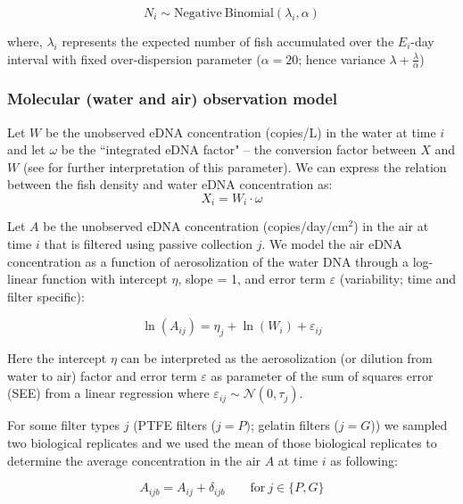 \documentclass{article}
\begin{document}
\begin{equation}
N_i \sim \mathrm{Negative\ Binomial}(\lambda_i, \alpha)
\end{equation} 

where, $\lambda_i$ represents the expected number of fish accumulated over the $E_i$-day interval with fixed over-dispersion parameter ($\alpha =20$; hence variance $\lambda+\frac{\lambda}{\alpha}$) \cite{welch1993,guri2024a}

\subsubsection{Molecular (water and air) observation model}
Let $W$ be the unobserved eDNA concentration (copies/L) in the water at time $i$ and let $\omega$ be the ``integrated eDNA factor" -- the conversion factor between $X$ and $W$ (see \cite{guri2024a} for further interpretation of this parameter). We can express the relation between the fish density and water eDNA concentration as:
\begin{equation}
X_{i} = W_{i} \cdot \omega
\end{equation}

Let $A$ be the unobserved eDNA concentration (copies/day/cm$^2$) in the air at time $i$ that is filtered using passive collection $j$. We model the air eDNA concentration as a function of aerosolization of the water DNA through a log-linear function with intercept $\eta$, slope = 1, and error term $\varepsilon$ (variability; time and filter specific):

\begin{equation}
\ln(A_{ij}) = \eta_{j} + \ln(W_{i}) + \varepsilon_{ij}
\end{equation}

Here the intercept $\eta$ can be interpreted as the aerosolization (or dilution from water to air) factor and error term $\varepsilon$ as parameter of the sum of squares error (SEE) from a linear regression where $\varepsilon_{ij} \sim \mathcal{N}(0,\tau_j)$.

For some filter types $j$ (PTFE filters (${j=P})$; gelatin filters (${j=G}$)) we sampled two biological replicates and we used the mean of those biological replicates to determine the average concentration in the air $A$ at time $i$ as following:

\begin{equation}
A_{ijb} = A_{ij} + \delta_{ijb} \qquad \text{for} \ j \in \{P,G\}
\end{equation}
\end{document}
